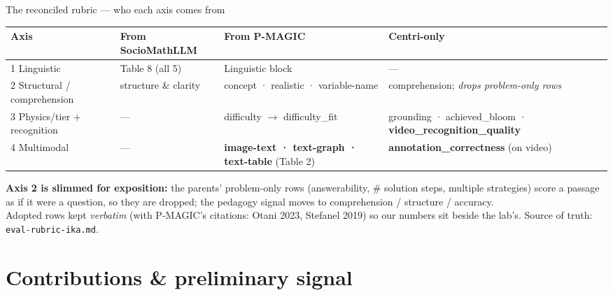 \documentclass[aspectratio=169,10pt]{beamer}
\newcommand{\hl}[1]{{\bfseries\color{cAccent}#1}}
\begin{document}
\begin{frame}{The reconciled rubric --- who each axis comes from}
\scriptsize
\renewcommand{\arraystretch}{1.35}
\begin{center}
\begin{tabular}{@{}p{2.3cm}p{2.6cm}p{3.1cm}p{3.2cm}@{}}
\toprule
\textbf{Axis} & \textbf{\color{cPed}From SocioMathLLM} & \textbf{\color{cMeas}From P-MAGIC} & \textbf{\color{cApp}Centri-only} \\
\midrule
1 Linguistic & Table 8 (all 5) & Linguistic block & --- \\
2 Structural / comprehension & structure \& clarity & concept · realistic · variable-name & comprehension; \emph{drops problem-only rows} \\
3 Physics/tier $+$ recognition & --- & difficulty $\to$ difficulty\_fit & grounding · achieved\_bloom · \hl{video\_recognition\_quality} \\
4 Multimodal & --- & \textbf{image-text · text-graph · text-table} (Table 2) & \hl{annotation\_correctness} (on video) \\
\bottomrule
\end{tabular}
\end{center}
\vspace{0.3em}
{\footnotesize \textbf{Axis 2 is slimmed for exposition:} the parents' problem-only rows
(answerability, \# solution steps, multiple strategies) score a passage as if it were a question, so
they are dropped; the pedagogy signal moves to comprehension / structure / accuracy.\\[3pt]
Adopted rows kept \emph{verbatim} (with P-MAGIC's citations: Otani 2023, Stefanel 2019) so our numbers
sit beside the lab's. Source of truth: \texttt{eval-rubric-ika.md}.}
\end{frame}

\section{Contributions \& preliminary signal}
\end{document}

